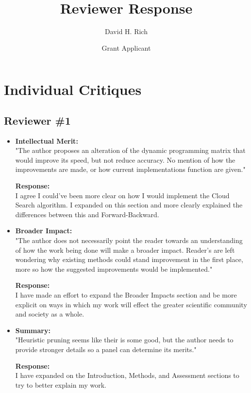 \documentclass{article}
\title{Reviewer Response}
\author{David H. Rich}
\date{Grant Applicant}
\begin{document}
	\maketitle%
	\thispagestyle{empty}
	\vspace{16pt}
	
	\section{Individual Critiques}
	
	\subsection{Reviewer \#1}
		
	\begin{itemize}
		 \item 
		 	\textbf{Intellectual Merit:} \\
			 "The author proposes an alteration of the dynamic programming matrix that would improve its speed, but not reduce accuracy. No mention of how the improvements are made, or how current implementations function are given."
			 
			\textbf{Response:} \\
			 I agree I could've been more clear on how I would implement the Cloud Search algorithm.  I expanded on this section and more clearly explained the differences between this and Forward-Backward.
		
		\item 
			\textbf{Broader Impact:} \\
			"The author does not necessarily point the reader towards an understanding
			of how the work being done will make a broader impact. Reader's are left
			wondering why existing methods could stand improvement in the first place,
			more so how the suggested improvements would be implemented."
			
			\textbf{Response:} \\
			I have made an effort to expand the Broader Impacts section and be more explicit on ways in which my work will effect the greater scientific community and society as a whole.
		
		\item 
			\textbf{Summary:} \\
			"Heuristic pruning seems like their is some good, but the author needs to provide
			stronger details so a panel can determine its merits."
			
			\textbf{Response:} \\
			I have expanded on the Introduction, Methods, and Assessment sections to try to better explain my work.
			
	\end{itemize}
\end{document}
